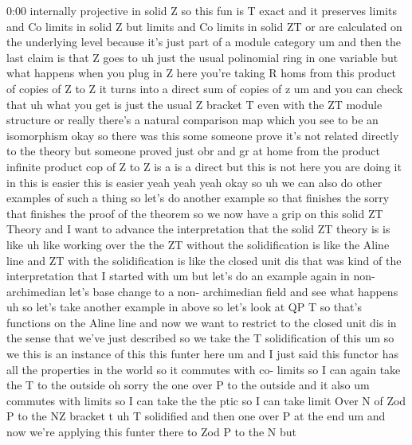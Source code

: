 \begin{unfinished}{0:00}
internally  projective  in  solid  Z  so  this
fun  is  T  exact  and  it  preserves  limits
and  Co  limits  in  solid  Z  but  limits  and
Co  limits  in  solid  ZT  or  are  calculated
on  the  underlying  level  because  it's
just  part  of  a  module
category
um  and  then  the  last  claim  is  that  Z
goes  to  uh  just  the  usual  polinomial
ring  in  one  variable  but  what  happens
when  you  plug  in  Z  here  you're  taking  R
homs  from  this  product  of  copies  of  Z  to
Z  it  turns  into  a  direct  sum  of  copies
of
z  um  and  you  can  check  that  uh  what  you
get  is  just  the  usual  Z  bracket  T  even
with  the  ZT  module  structure  or  really
there's  a  natural  comparison  map  which
you  see  to  be  an
isomorphism  okay  so  there  was  this  some
someone  prove  it's  not  related  directly
to  the  theory  but  someone  proved  just
obr  and  gr  at  home  from  the  product
infinite  product  cop  of  Z  to  Z  is  a  is  a
direct  but  this  is  not  here  you  are
doing  it  in  this  is  easier  this  is
easier  yeah  yeah
yeah  okay
so  uh  we  can  also  do  other  examples  of
such  a  thing  so  let's  do  another  example
so  that  finishes  the  sorry  that  finishes
the  proof  of  the  theorem  so  we  now  have
a  grip  on  this  solid  ZT  Theory  and  I
want  to  advance  the  interpretation  that
the  solid  ZT  theory  is  is  like  uh  like
working  over  the  the  ZT  without  the
solidification  is  like  the  Aline  line
and  ZT  with  the  solidification  is  like
the  closed  unit  dis  that  was  kind  of  the
interpretation  that  I  started  with  um
but  let's  do  an  example  again  in  non-
archimedian  let's  base  change  to  a  non-
archimedian  field  and  see  what  happens
uh  so  let's  take  another  example  in
above  so  let's  look  at  QP  T  so  that's
functions  on  the  Aline  line  and  now  we
want  to  restrict  to  the  closed  unit  dis
in  the  sense  that  we've  just  described
so  we  take  the  T  solidification  of
this
um  so  we  this  is  an  instance  of  this
this  funter  here  um  and  I  just  said  this
functor  has  all  the  properties  in  the
world  so  it  commutes  with  co-  limits  so
I  can  again  take  the  T  to  the
outside  oh  sorry  the  one  over  P  to  the
outside  and  it  also  um  commutes  with
limits  so  I  can  take  the  the
ptic  so  I  can  take  limit  Over  N  of  Zod  P
to  the
NZ  bracket
t  uh  T  solidified  and  then  one  over  P  at
the
end  um  and  now  we're  applying  this
funter  there  to  Zod  P  to  the  N  but

\end{unfinished}

